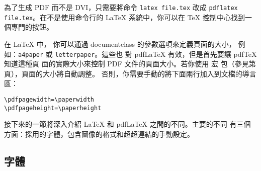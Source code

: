 為了生成 PDF 而不是 DVI，只需要將命令 \texttt{latex
file.tex} 改成 \texttt{pdflatex
file.tex}。在不是使用命令行的 \LaTeX{} 系統中，你可以在 \TeX{} 控制中心找到一個專門的按鈕。


在 \LaTeX{} 中，
你可以通過 documentclass 的參數選項來定義頁面的大小，
例如：\texttt{a4paper} 或 \texttt{letterpaper}。這些也
對 pdf\LaTeX{} 有效，但是首先要讓 pdf\TeX{} 知道這種頁
面的實際大小來控制 PDF 文件的頁面大小。若你使用  宏
包（參見第 \pageref{ssec:pdfhyperref} 頁），頁面的大小將自動調整。
否則，你需要手動的將下面兩行加入到文檔的導言區：
\begin{code}
\begin{verbatim}
\pdfpagewidth=\paperwidth
\pdfpageheight=\paperheight
\end{verbatim}
\end{code}


接下來的一節將深入介紹 \LaTeX{} 和 pdf\LaTeX{} 之間的不同。主要的不同
有三個方面：採用的字體，包含圖像的格式和超超連結的手動設定。

\subsection{字體}

